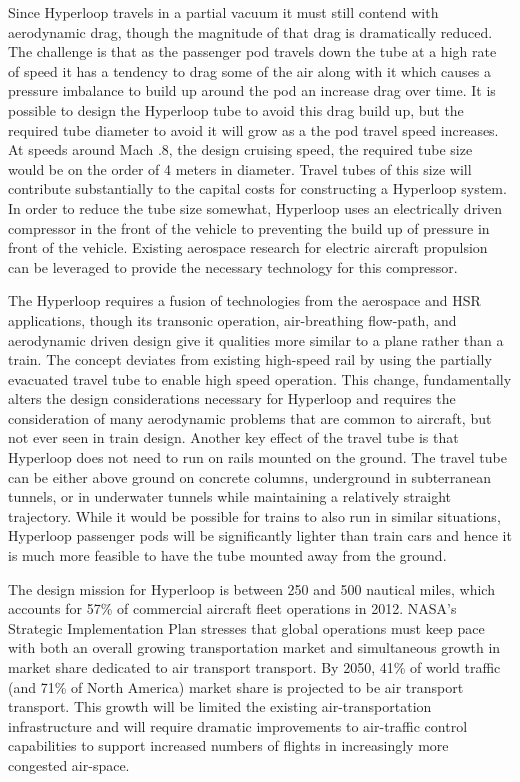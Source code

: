 	Since Hyperloop travels in a partial vacuum it must still contend with
	aerodynamic drag, though the magnitude of that drag is dramatically
	reduced. The challenge is that as the passenger pod travels down the tube
	at a high rate of speed it has a tendency to drag some of the air along
	with it which causes a pressure imbalance to build up around the pod an
	increase drag over time. It is possible to design the Hyperloop tube to
	avoid this drag build up, but the required tube diameter to avoid it will
	grow as a the pod travel speed increases. At speeds around Mach .8, the
	design cruising speed, the required tube size would be on the order of 4
	meters in diameter. Travel tubes of this size will contribute
	substantially to the capital costs for constructing a Hyperloop system.
	In order to reduce the tube size somewhat, Hyperloop uses an electrically
	driven compressor in the front of the vehicle to preventing the build up
	of pressure in front of the vehicle. Existing aerospace research for
	electric aircraft propulsion can be leveraged to provide the necessary
	technology for this compressor.

	The Hyperloop requires a fusion of technologies from the aerospace and HSR
	applications, though its transonic operation, air-breathing flow-path, and
	aerodynamic driven design give it qualities more similar to a plane rather
	than a train. The concept deviates from existing high-speed rail by using
	the partially evacuated travel tube to enable high speed operation. This
	change, fundamentally alters the design considerations necessary for
	Hyperloop and requires the consideration of many aerodynamic problems that
	are common to aircraft, but not ever seen in train design. Another key
	effect of the travel tube is that Hyperloop does not need to run on rails
	mounted on the ground. The travel tube can be either above ground on
	concrete columns, underground in subterranean tunnels, or in underwater
	tunnels while maintaining a relatively straight trajectory. While it would
	be possible for trains to also run in similar situations, Hyperloop
	passenger pods will be significantly lighter than train cars and hence it
	is much more feasible to have the tube mounted away from the ground. 

	The design mission for Hyperloop is between 250 and 500 nautical miles,
	which accounts for 57\% of commercial aircraft fleet operations in 2012.
	NASA's Strategic Implementation Plan stresses that global operations must
	keep pace with both an overall growing transportation market and
	simultaneous growth in market share dedicated to air transport transport.
	By 2050, 41\% of world traffic (and 71\% of North America) market share is
	projected to be air transport transport.\cite{Schafer} This growth will be
	limited the existing air-transportation infrastructure and will require
	dramatic improvements to air-traffic control capabilities to support
	increased numbers of flights in increasingly more congested air-space.

